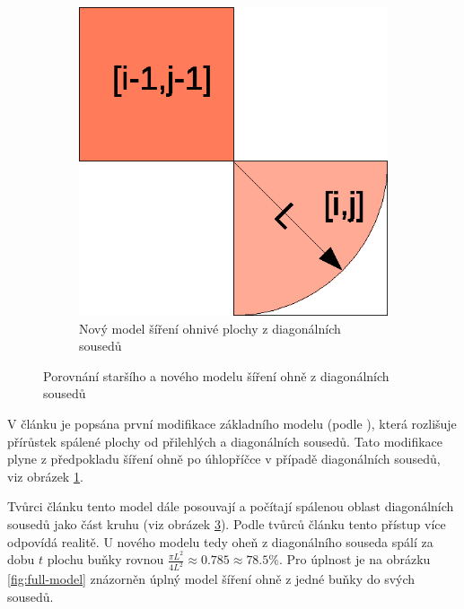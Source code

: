 \documentclass[11pt,a4paper]{scrartcl}
\begin{document}
\begin{figure}[H]
\begin{subfigure}{0.3 \textwidth}
			\label{fig:diag-model-old}
		\end{subfigure}
		\begin{subfigure} {0.3 \textwidth}
			\includegraphics[width=\linewidth]{new-model-diag-spread}
			\caption{Nový model šíření ohnivé plochy z diagonálních sousedů}
			\label{fig:diag-model-new}
		\end{subfigure}
		\caption{Porovnání staršího a nového modelu šíření ohně z diagonálních sousedů}
	\end{figure}
	
	V článku je popsána první modifikace základního modelu (podle \cite{old_model_art}), která rozlišuje přírůstek spálené plochy od přilehlých a diagonálních sousedů. Tato modifikace plyne z předpokladu šíření ohně po úhlopříčce v případě diagonálních sousedů, viz obrázek \ref{fig:diag-model-old}.

	Tvůrci článku tento model dále posouvají a počítají spálenou oblast diagonálních sousedů jako část kruhu (viz obrázek \ref{fig:diag-model-new}). Podle tvůrců článku tento přístup více odpovídá realitě. U nového modelu tedy oheň z diagonálního souseda spálí za dobu $t$ plochu buňky rovnou $\frac{\pi L^2}{4L^2} \approx 0.785 \approx 78.5\%$. Pro úplnost je na obrázku \ref{fig:full-model} znázorněn úplný model šíření ohně z jedné buňky do svých sousedů.
	
\end{document}
